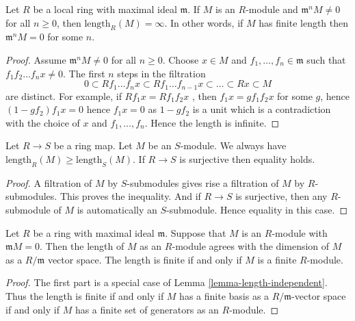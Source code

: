 \begin{lemma}
\label{lemma-length-infinite}
Let $R$ be a local ring with maximal ideal $\mathfrak m$.
If $M$ is an $R$-module and $\mathfrak m^n M \not = 0$ for all $n \geq 0$,
then $\text{length}_R(M) = \infty$. In other words, if $M$
has finite length then $\mathfrak m^nM = 0$ for some $n$.
\end{lemma}

\begin{proof}
Assume $\mathfrak m^n M \not = 0$ for all $n\geq 0$.
Choose $x \in M$ and $f_1, \ldots, f_n \in \mathfrak m$
such that $f_1f_2 \ldots f_n x \not = 0$.
The first $n$ steps in the filtration
$$
0 \subset R f_1 \ldots f_n x \subset R f_1 \ldots f_{n - 1} x
\subset \ldots \subset R x \subset M
$$
are distinct. For example, if
$R f_1 x = R f_1 f_2 x$ , then $f_1 x = g f_1 f_2 x$ for some $g$,
hence $(1 - gf_2) f_1 x = 0$ hence $f_1 x = 0$ as $1 - gf_2$ is a unit
which is a contradiction with the choice of $x$ and $f_1, \ldots, f_n$.
Hence the length is infinite.
\end{proof}

\begin{lemma}
\label{lemma-length-independent}
Let $R \to S$ be a ring map. Let $M$ be an $S$-module.
We always have $\text{length}_R(M) \geq \text{length}_S(M)$.
If $R \to S$ is surjective then equality holds.
\end{lemma}

\begin{proof}
A filtration of $M$ by $S$-submodules gives rise a filtration
of $M$ by $R$-submodules. This proves the inequality.
And if $R \to S$ is surjective, then any $R$-submodule
of $M$ is automatically an $S$-submodule. Hence equality
in this case.
\end{proof}

\begin{lemma}
\label{lemma-dimension-is-length}
Let $R$ be a ring with maximal ideal $\mathfrak m$.
Suppose that $M$ is an $R$-module with
$\mathfrak m M  =  0$. Then the length of $M$ as
an $R$-module agrees with the dimension of $M$ as
a $R/\mathfrak m$ vector space.
The length is finite if and only if $M$ is a finite $R$-module.
\end{lemma}

\begin{proof}
The first part is a special case of Lemma \ref{lemma-length-independent}.
Thus the length is finite if and only if $M$ has a finite basis
as a $R/\mathfrak m$-vector space if and only if $M$ has a finite
set of generators as an $R$-module.
\end{proof}

